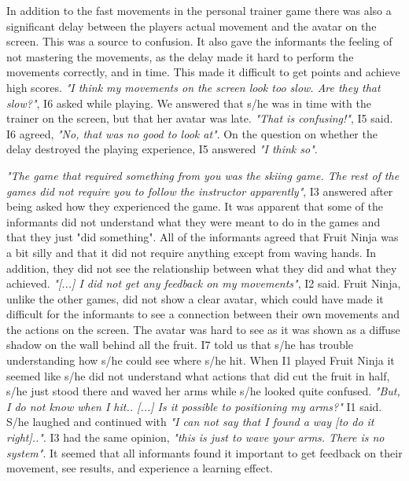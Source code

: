 In addition to the fast movements in the personal trainer game there was also a significant delay between the players actual movement and the avatar on the screen. This was a source to confusion. It also gave the informants the feeling of not mastering the movements, as the delay made it hard to perform the movements correctly, and in time. This made it difficult to get points and achieve high scores. \emph{"I think my movements on the screen look too slow. Are they that slow?"}, I6 asked while playing. We answered that s/he was in time with the trainer on the screen, but that her avatar was late. \emph{"That is confusing!"}, I5 said. I6 agreed, \emph{"No, that was no good to look at"}. On the question on whether the delay destroyed the playing experience, I5 answered \emph{"I think so"}.

\emph{"The game that required something from you was the skiing game. The rest of the games did not require you to follow the instructor apparently"}, I3 answered after being asked how they experienced the game. It was apparent that some of the informants did not understand what they were meant to do in the games and that they just "did something". All of the informants agreed that Fruit Ninja was a bit silly and that it did not require anything except from waving hands. In addition, they did not see the relationship between what they did and what they achieved. \emph{"[...] I did not get any feedback on my movements"}, I2 said. Fruit Ninja, unlike the other games, did not show a clear avatar, which could have made it difficult for the informants to see a connection between their own movements and the actions on the screen. The avatar was hard to see as it was shown as a diffuse shadow on the wall behind all the fruit. I7 told us that s/he has trouble understanding how s/he could see where s/he hit. When I1 played Fruit Ninja it seemed like s/he did not understand what actions that did cut the fruit in half, s/he just stood there and waved her arms while s/he looked quite confused. \emph{"But, I do not know when I hit.. [...] Is it possible to positioning my arms?"} I1 said. S/he laughed and continued with \emph{"I can not say that I found a way [to do it right].."}. I3 had the same opinion, \emph{"this is just to wave your arms. There is no system"}. It seemed that all informants found it important to get feedback on their movement, see results, and experience a learning effect. 

